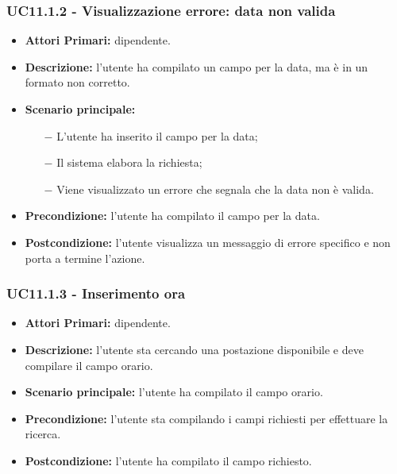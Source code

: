 \subsubsection{ UC11.1.2 - Visualizzazione errore: data non valida  }
\begin{itemize}
	\item\textbf{Attori Primari:} dipendente.
	\item\textbf{Descrizione:} l’utente ha compilato un campo per la data, ma è in un formato non corretto.
	\item\textbf{Scenario principale:} 
	\begin{itemize}
		\item[$-$] L’utente ha inserito il campo per la data;
		\item[$-$] Il sistema elabora la richiesta;
		\item[$-$] Viene visualizzato un errore che segnala che la data non è valida.
	\end{itemize}
	\item\textbf{Precondizione:} l’utente ha compilato il campo per la data.
	\item\textbf{Postcondizione:} l’utente visualizza un messaggio di errore specifico e non porta a termine l’azione.
\end{itemize}
\subsubsection{ UC11.1.3 - Inserimento ora }
\begin{itemize}
	\item\textbf{Attori Primari:} dipendente.
	\item\textbf{Descrizione:} l’utente sta cercando una postazione disponibile e deve compilare il campo orario.
	\item\textbf{Scenario principale:} l’utente ha compilato il campo orario.
	\item\textbf{Precondizione:} l’utente sta compilando i campi richiesti per effettuare la ricerca.
	\item\textbf{Postcondizione:} l’utente ha compilato il campo richiesto.
\end{itemize}
